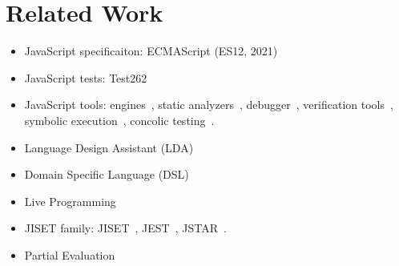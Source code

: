 \section{Related Work}\label{sec:related}

\begin{itemize}
  \item JavaScript specificaiton: ECMAScript (ES12, 2021)~\cite{es12}
  \item JavaScript tests: Test262~\cite{test262}
  \item JavaScript tools: engines~\cite{v8, jscore, chakra, spidermonkey},
    static analyzers~\cite{safe, safe2, tajs, wala, jsai},
    debugger~\cite{jsexplain}, verification tools~\cite{javert, javert2,
    ad-safety, javanni}, symbolic execution~\cite{symbolic-js, sym-js, expo-se},
    concolic testing~\cite{jalangi, type-conc-test}.
  \item Language Design Assistant (LDA)~\cite{lda, lisa, ipld, asf-sdf,
    meta-env, faustine}
  \item Domain Specific Language (DSL)~\cite{dsl-survey, dsl-survey2}
  \item Live Programming~\cite{omnicode, situ-vis, proj-box}
  \item JISET family: JISET~\cite{jiset}, JEST~\cite{jest}, JSTAR~\cite{jstar}.
  \item Partial Evaluation~\cite{peval, peval-survey}
\end{itemize}

\todo
